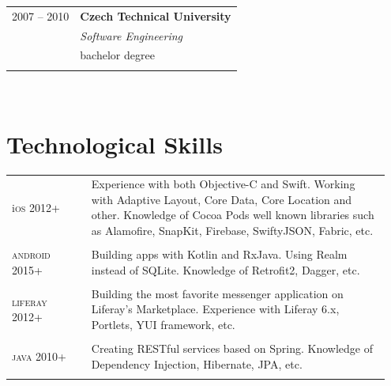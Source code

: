 \documentclass[10pt]{article} %
\begin{document}
\begin{minipage}[t]{0.5\textwidth}
\begin{tabular}{@{}rl@{}}
\small\textsc{2007 -- 2010} & \large\textbf{Czech Technical University} \\ 
& \normalsize\textit{Software Engineering} \\ 
& \normalsize {bachelor degree} \\ 
&\\

\end{tabular}\\[10pt]



\section{Technological Skills} 

\medskip
\begin{tabular}{@{}p{0.2\linewidth}p{0.75\linewidth}@{}} 

\small{i}\large\textsc{os} \newline \small\textsc{2012+} & 
Experience with both Objective-C and Swift. Working with Adaptive Layout, Core Data, Core Location and other.\newline
Knowledge of Cocoa Pods well known libraries such as Alamofire, SnapKit, Firebase, 
\newline SwiftyJSON, Fabric, etc. \\
&\\

\large\textsc{android} \newline \small\textsc{2015+} & 
Building apps with Kotlin and RxJava. \newline Using Realm instead of SQLite.
Knowledge of  Retrofit2, Dagger, etc. \\
&\\

\large\textsc{liferay} \newline \small\textsc{2012+} & 
Building the most favorite messenger application on Liferay's Marketplace.
Experience with Liferay 6.x, Portlets, YUI framework, etc. \\
&\\

\large\textsc{java} \newline \small\textsc{2010+} & 
Creating RESTful services based on Spring. Knowledge of Dependency Injection, Hibernate, JPA, etc. \\
&\\


\end{tabular}
\end{minipage}
\end{document}
